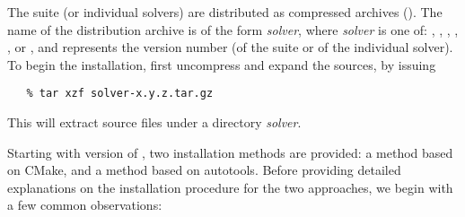 The {\sundials} suite (or individual solvers) are distributed as
compressed archives (). The name of the distribution
archive is of the form {\em solver}, where {\em
solver} is one of: , , , ,
, or , and  represents the version number
(of the {\sundials} suite or of the individual solver).
To begin the installation, first uncompress and expand the sources, by issuing
\begin{verbatim}
   % tar xzf solver-x.y.z.tar.gz
\end{verbatim}
This will extract source files under a directory {\em solver}.

Starting with version  of {\sundials}, two installation methods
are provided: a method based on CMake, and a method based on autotools.
Before providing detailed explanations on the installation procedure
for the two approaches, we begin with a few common observations:

